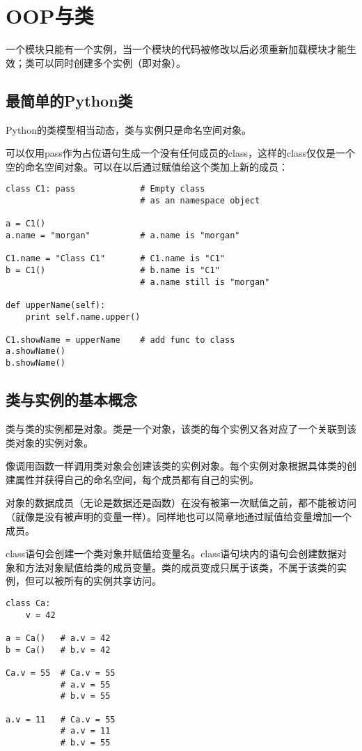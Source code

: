 \chapter{OOP与类}

一个模块只能有一个实例，当一个模块的代码被修改以后必须重新加载模块才能生效；类可以同时创建多个实例（即对象）。

\section{最简单的Python类}

Python的类模型相当动态，类与实例只是命名空间对象。

可以仅用pass作为占位语句生成一个没有任何成员的class，这样的class仅仅是一个空的命名空间对象。可以在以后通过赋值给这个类加上新的成员：

\begin{lstlisting}
class C1: pass             # Empty class
                           # as an namespace object

a = C1()
a.name = "morgan"          # a.name is "morgan"

C1.name = "Class C1"       # C1.name is "C1"
b = C1()                   # b.name is "C1"
                           # a.name still is "morgan"

def upperName(self):
	print self.name.upper()

C1.showName = upperName    # add func to class
a.showName()
b.showName()
\end{lstlisting}

\section{类与实例的基本概念}

类与类的实例都是对象。类是一个对象，该类的每个实例又各对应了一个关联到该类对象的实例对象。

像调用函数一样调用类对象会创建该类的实例对象。每个实例对象根据具体类的创建属性并获得自己的命名空间，每个成员都有自己的实例。

对象的数据成员（无论是数据还是函数）在没有被第一次赋值之前，都不能被访问（就像是没有被声明的变量一样）。同样地也可以简章地通过赋值给变量增加一个成员。

class语句会创建一个类对象并赋值给变量名。class语句块内的语句会创建数据对象和方法对象赋值给类的成员变量。类的成员变成只属于该类，不属于该类的实例，但可以被所有的实例共享访问。

\begin{lstlisting}
class Ca:
	v = 42

a = Ca()   # a.v = 42
b = Ca()   # b.v = 42

Ca.v = 55  # Ca.v = 55
           # a.v = 55
		   # b.v = 55

a.v = 11   # Ca.v = 55
           # a.v = 11
		   # b.v = 55
\end{lstlisting}

